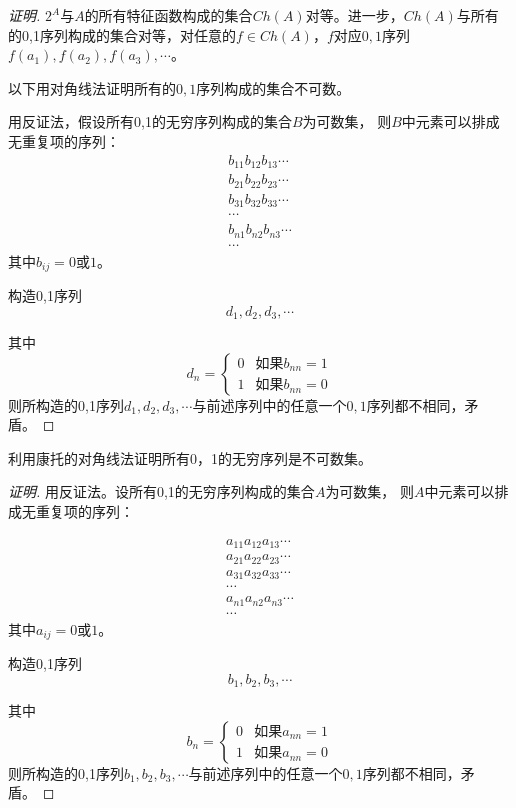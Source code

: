 \documentclass{article}
\begin{document}
\begin{CJK}{UTF8}{gbsn}
\begin{proof}[证明]
  $2^A$与$A$的所有特征函数构成的集合$Ch(A)$对等。进一步，$Ch(A)$与所有的0,1序列构成的集合对等，对任意的$f\in Ch(A)$，$f$对应$0,1$序列$f(a_1),f(a_2),f(a_3),\cdots$。
  
  以下用对角线法证明所有的$0,1$序列构成的集合不可数。

  用反证法，假设所有0,1的无穷序列构成的集合$B$为可数集，
  则$B$中元素可以排成无重复项的序列：
  \begin{align*}
    b_{11}b_{12}b_{13}\cdots\\
    b_{21}b_{22}b_{23}\cdots\\
    b_{31}b_{32}b_{33}\cdots\\
    \cdots\\
    b_{n1}b_{n2}b_{n3}\cdots\\
    \cdots
  \end{align*}
 其中$b_{ij}=0$或$1$。
  
 构造0,1序列
\[d_1,d_2,d_3,\cdots\]

其中
\[d_n=
\begin{cases}
  0&\text{如果}b_{nn}=1\\
  1&\text{如果}b_{nn}=0
\end{cases}\]
则所构造的0,1序列$d_1,d_2,d_3,\cdots$与前述序列中的任意一个$0,1$序列都不相同，矛盾。

\end{proof}  

\begin{Exercise}
  利用康托的对角线法证明所有0，1的无穷序列是不可数集。
\end{Exercise}
\begin{proof}[证明]
  用反证法。设所有0,1的无穷序列构成的集合$A$为可数集，
  则$A$中元素可以排成无重复项的序列：

  \begin{align*}
    a_{11}a_{12}a_{13}\cdots\\
    a_{21}a_{22}a_{23}\cdots\\
    a_{31}a_{32}a_{33}\cdots\\
    \cdots\\
    a_{n1}a_{n2}a_{n3}\cdots\\
    \cdots
  \end{align*}
  其中$a_{ij}=0$或$1$。

  构造0,1序列
\[b_1,b_2,b_3,\cdots\]

其中
\[b_n=
\begin{cases}
  0&\text{如果}a_{nn}=1\\
  1&\text{如果}a_{nn}=0
\end{cases}\]
则所构造的0,1序列$b_1,b_2,b_3,\cdots$与前述序列中的任意一个$0,1$序列都不相同，矛盾。
\end{proof}


\end{CJK}
\end{document}
